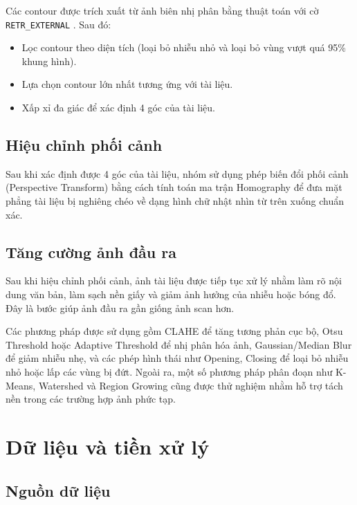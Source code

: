 \documentclass[12pt, a4paper]{report}
\begin{document}
Các contour được trích xuất từ ảnh biên nhị phân bằng thuật toán với cờ \texttt{RETR\_EXTERNAL} \cite{opencv_docs}. Sau đó:

\begin{itemize}
    \item Lọc contour theo diện tích (loại bỏ nhiễu nhỏ và loại bỏ vùng vượt quá 95\% khung hình).
    \item Lựa chọn contour lớn nhất tương ứng với tài liệu.
    \item Xấp xỉ đa giác để xác định 4 góc của tài liệu.
\end{itemize}

\subsection{Hiệu chỉnh phối cảnh}

Sau khi xác định được 4 góc của tài liệu, nhóm sử dụng phép biến đổi phối cảnh (Perspective Transform) bằng cách tính toán ma trận Homography \cite{gonzalez2018} để đưa mặt phẳng tài liệu bị nghiêng chéo về dạng hình chữ nhật nhìn từ trên xuống chuẩn xác.

\subsection{Tăng cường ảnh đầu ra}

Sau khi hiệu chỉnh phối cảnh, ảnh tài liệu được tiếp tục xử lý nhằm làm rõ nội dung văn bản, làm sạch nền giấy và giảm ảnh hưởng của nhiễu hoặc bóng đổ. Đây là bước giúp ảnh đầu ra gần giống ảnh scan hơn.

Các phương pháp được sử dụng gồm CLAHE để tăng tương phản cục bộ, Otsu Threshold \cite{otsu1979} hoặc Adaptive Threshold để nhị phân hóa ảnh, Gaussian/Median Blur để giảm nhiễu nhẹ, và các phép hình thái như Opening, Closing để loại bỏ nhiễu nhỏ hoặc lấp các vùng bị đứt. Ngoài ra, một số phương pháp phân đoạn như K-Means, Watershed \cite{opencv_docs} và Region Growing \cite{gonzalez2018} cũng được thử nghiệm nhằm hỗ trợ tách nền trong các trường hợp ảnh phức tạp.


\section{Dữ liệu và tiền xử lý}

\subsection{Nguồn dữ liệu}
\end{document}
